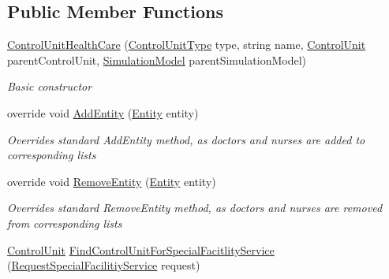 \subsection*{Public Member Functions}
\begin{DoxyCompactItemize}
\item 
\hyperlink{class_general_health_care_elements_1_1_control_units_1_1_control_unit_health_care_a19442b3aa7c060c4f8d934084fd9bd0c}{Control\+Unit\+Health\+Care} (\hyperlink{namespace_enums_aeea01f7c2eb29cb3e9e88daa9732d231}{Control\+Unit\+Type} type, string name, \hyperlink{class_simulation_core_1_1_h_c_c_m_elements_1_1_control_unit}{Control\+Unit} parent\+Control\+Unit, \hyperlink{class_simulation_core_1_1_simulation_classes_1_1_simulation_model}{Simulation\+Model} parent\+Simulation\+Model)
\begin{DoxyCompactList}\small\item\em Basic constructor \end{DoxyCompactList}\item 
override void \hyperlink{class_general_health_care_elements_1_1_control_units_1_1_control_unit_health_care_a525aa6f90ab70aaa5c98347261500247}{Add\+Entity} (\hyperlink{class_simulation_core_1_1_h_c_c_m_elements_1_1_entity}{Entity} entity)
\begin{DoxyCompactList}\small\item\em Overrides standard Add\+Entity method, as doctors and nurses are added to corresponding lists \end{DoxyCompactList}\item 
override void \hyperlink{class_general_health_care_elements_1_1_control_units_1_1_control_unit_health_care_a5064740c6680e756682ff376b6834733}{Remove\+Entity} (\hyperlink{class_simulation_core_1_1_h_c_c_m_elements_1_1_entity}{Entity} entity)
\begin{DoxyCompactList}\small\item\em Overrides standard Remove\+Entity method, as doctors and nurses are removed from corresponding lists \end{DoxyCompactList}\item 
\hyperlink{class_simulation_core_1_1_h_c_c_m_elements_1_1_control_unit}{Control\+Unit} \hyperlink{class_general_health_care_elements_1_1_control_units_1_1_control_unit_health_care_ab325305bf7593ee884e4dce43faab324}{Find\+Control\+Unit\+For\+Special\+Facitlity\+Service} (\hyperlink{class_general_health_care_elements_1_1_special_facility_1_1_request_special_facilitiy_service}{Request\+Special\+Facilitiy\+Service} request)

\end{DoxyCompactItemize}
